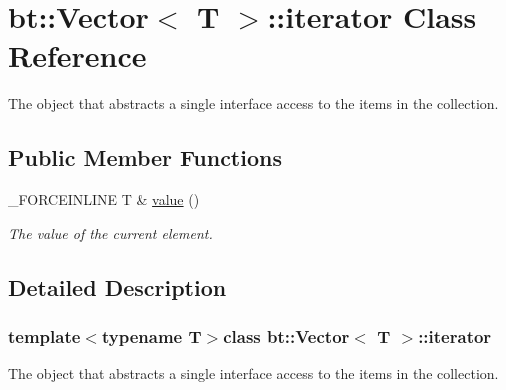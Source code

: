 \hypertarget{classbt_1_1_vector_1_1iterator}{\section{bt\-:\-:Vector$<$ T $>$\-:\-:iterator Class Reference}
\label{classbt_1_1_vector_1_1iterator}
}


The object that abstracts a single interface access to the items in the collection.  


\subsection*{Public Member Functions}
\begin{DoxyCompactItemize}
\item 
\hypertarget{classbt_1_1_vector_1_1iterator_aa597221642757c8438bf0096f9e70b9f}{\-\_\-\-F\-O\-R\-C\-E\-I\-N\-L\-I\-N\-E T \& \hyperlink{classbt_1_1_vector_1_1iterator_aa597221642757c8438bf0096f9e70b9f}{value} ()}\label{classbt_1_1_vector_1_1iterator_aa597221642757c8438bf0096f9e70b9f}

\begin{DoxyCompactList}\small\item\em The value of the current element. \end{DoxyCompactList}\end{DoxyCompactItemize}


\subsection{Detailed Description}
\subsubsection*{template$<$typename T$>$class bt\-::\-Vector$<$ T $>$\-::iterator}

The object that abstracts a single interface access to the items in the collection. 
